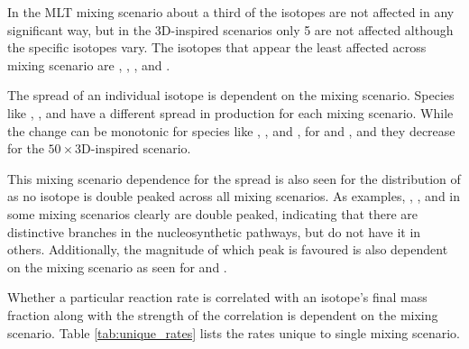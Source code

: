 In the MLT mixing scenario about a third of the isotopes are not affected in any significant way, but in the 3D-inspired scenarios only 5 are not affected although the specific isotopes vary.
The isotopes that appear the least affected across mixing scenario are \cerium[138], \gadolinium[152], \dysprosium[158], and \tantalum[180].

The spread of an individual isotope is dependent on the mixing scenario.
Species like \cadmium[106], \dysprosium[156], and \tungsten[180] have a different spread in production for each mixing scenario.
While the change can be monotonic for species like \tungsten[180], \osmium[184], and \platnium[190], for \cadmium[106] and \tin[112], and \barium[130] they decrease for the $50\times$3D-inspired scenario.

This mixing scenario dependence for the spread is also seen for the distribution of \OP{} as no isotope is double peaked across all mixing scenarios.
As examples, \selenium[74], \indium[113], and \lanthanum[138] in some mixing scenarios clearly are double peaked, indicating that there are distinctive branches in the nucleosynthetic pathways, but do not have it in others.
Additionally, the magnitude of which peak is favoured is also dependent on the mixing scenario as seen for \krypton[78] and \strontium[84].

Whether a particular reaction rate is correlated with an isotope's final mass fraction along with the strength of the correlation is dependent on the mixing scenario.
Table \ref{tab:unique_rates} lists the rates unique to single mixing scenario.

